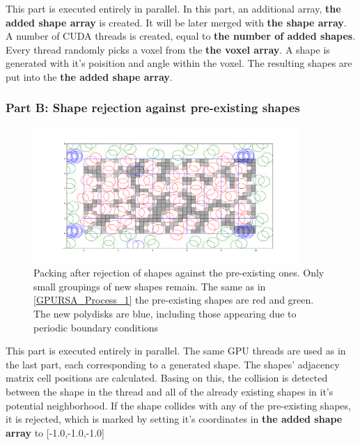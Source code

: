 \documentclass[12pt, oneside]{report}
\begin{document}
This part is executed entirely in parallel. \newline
In this part, an additional array, \textbf{the added shape array} is created. It will be later merged with \textbf{the shape array}. \newline
A number of CUDA threads is created, equal to \textbf{the number of added shapes}. Every thread randomly picks a voxel from the \textbf{the voxel array}. A shape is generated with it's poisition and angle within the voxel. The resulting shapes are put into the \textbf{the added shape array}.

\subsubsection{Part B: Shape rejection against pre-existing shapes}

\begin{figure}[H]
  \centering
	\includegraphics[width=0.9\textwidth,keepaspectratio]{Images/GPURSA/Figure_3.pdf}
	\caption{Packing after rejection of shapes against the pre-existing ones. Only small groupings of new shapes remain. The same as in \ref{GPURSA_Process_1} the pre-existing shapes are red and green. The new polydisks are blue, including those appearing due to periodic boundary conditions}
	\label{GPURSA_Process_2}
\end{figure}

This part is executed entirely in parallel. \newline
The same GPU threads are used as in the last part, each corresponding to a generated shape. The shapes' adjacency matrix cell positions are calculated. Basing on this, the collision is detected between the shape in the thread and all of the already existing shapes in it's potential neighborhood. If the shape collides with any of the pre-existing shapes, it is rejected, which is marked by setting it's coordinates in \textbf{the added shape array} to [-1.0,-1.0,-1.0]
\end{document}
